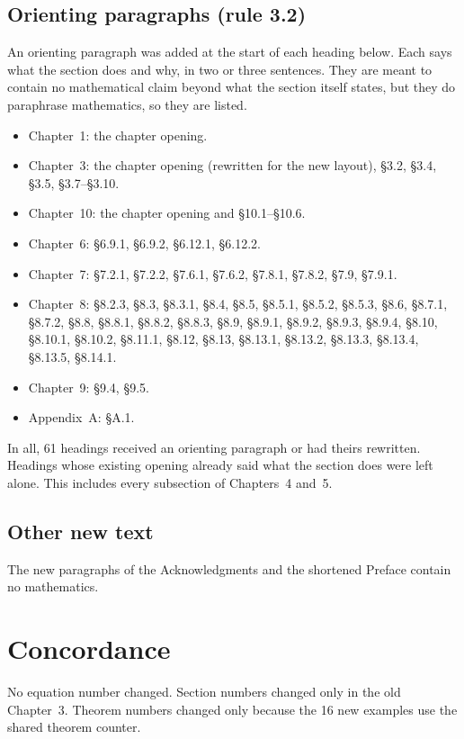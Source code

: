 \documentclass[12pt,letterpaper]{article}
\begin{document}
\subsection{Orienting paragraphs (rule 3.2)}
An orienting paragraph was added at the start of each heading below. Each says what the section does and why, in two or three sentences. They are meant to contain no mathematical claim beyond what the section itself states, but they do paraphrase mathematics, so they are listed.
\begin{itemize}[leftmargin=*]
\item Chapter~1: the chapter opening.
\item Chapter~3: the chapter opening (rewritten for the new layout), \S3.2, \S3.4, \S3.5, \S3.7--\S3.10.
\item Chapter~10: the chapter opening and \S10.1--\S10.6.
\item Chapter~6: \S{}6.9.1, \S{}6.9.2, \S{}6.12.1, \S{}6.12.2.
\item Chapter~7: \S{}7.2.1, \S{}7.2.2, \S{}7.6.1, \S{}7.6.2, \S{}7.8.1, \S{}7.8.2, \S{}7.9, \S{}7.9.1.
\item Chapter~8: \S{}8.2.3, \S{}8.3, \S{}8.3.1, \S{}8.4, \S{}8.5, \S{}8.5.1, \S{}8.5.2, \S{}8.5.3, \S{}8.6, \S{}8.7.1, \S{}8.7.2, \S{}8.8, \S{}8.8.1, \S{}8.8.2, \S{}8.8.3, \S{}8.9, \S{}8.9.1, \S{}8.9.2, \S{}8.9.3, \S{}8.9.4, \S{}8.10, \S{}8.10.1, \S{}8.10.2, \S{}8.11.1, \S{}8.12, \S{}8.13, \S{}8.13.1, \S{}8.13.2, \S{}8.13.3, \S{}8.13.4, \S{}8.13.5, \S{}8.14.1.
\item Chapter~9: \S{}9.4, \S{}9.5.
\item Appendix~A: \S{}A.1.
\end{itemize}
In all, 61 headings received an orienting paragraph or had theirs rewritten. Headings whose existing opening already said what the section does were left alone. This includes every subsection of Chapters~4 and~5.

\subsection{Other new text}
The new paragraphs of the Acknowledgments and the shortened Preface contain no mathematics.

\section{Concordance}\label{sec:concordance}
No equation number changed. Section numbers changed only in the old Chapter~3. Theorem numbers changed only because the 16 new examples use the shared theorem counter.
\end{document}
